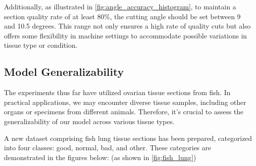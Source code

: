 Additionally, as illustrated in \autoref{fig:angle_accuracy_histogram}, to maintain a section quality rate of at least 80\%, the cutting angle should be set between 9 and 10.5 degrees. This range not only ensures a high rate of quality cuts but also offers some flexibility in machine settings to accommodate possible variations in tissue type or condition.


\subsection{Model Generalizability}

The experiments thus far have utilized ovarian tissue sections from fish. In practical applications, we may encounter diverse tissue samples, including other organs or specimens from different animals. Therefore, it's crucial to assess the generalizability of our model across various tissue types.

A new dataset comprising fish lung tissue sections has been prepared, categorized into four classes: good, normal, bad, and other. These categories are demonstrated in the figures below:
(as shown in \autoref{fig:fish_lung})


